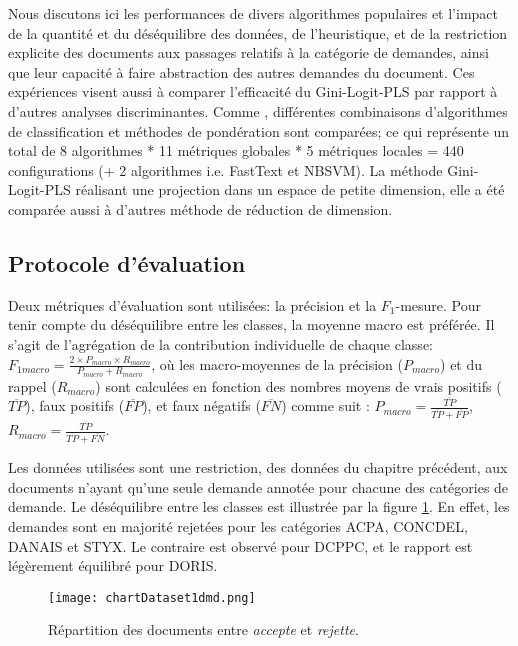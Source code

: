 Nous discutons ici les performances de divers algorithmes populaires et l'impact de la quantité et du déséquilibre des données, de l'heuristique, et de la restriction explicite des documents aux passages relatifs à la catégorie de demandes, ainsi que leur capacité à faire abstraction des autres demandes du document. {Ces expériences visent aussi à comparer l'efficacité du Gini-Logit-PLS par rapport à d'autres analyses discriminantes}. Comme \citet{im2017textclasstermweighting}, différentes combinaisons d'algorithmes de classification et méthodes de pondération sont comparées; ce qui représente un total de 8 algorithmes * 11 métriques globales * 5 métriques locales = 440 configurations (+ 2 algorithmes i.e. FastText et NBSVM). La méthode Gini-Logit-PLS réalisant une projection dans un espace de petite dimension, elle a été comparée aussi à d'autres méthode de réduction de dimension.

\subsection{Protocole d'évaluation}
Deux métriques d'évaluation sont utilisées: la précision et la $F_1$-mesure. Pour tenir compte du déséquilibre entre les classes, la moyenne macro est préférée. Il s'agit de l'agrégation de la contribution individuelle de chaque classe: $F_{1macro} = \frac{2 \times P_{macro} \times R_{macro}}{P_{macro} + R_{macro}}$, où les macro-moyennes de la précision ($P_{macro}$) et du rappel ($R_{macro}$) sont calculées en fonction des nombres moyens de vrais positifs ($\overline{TP}$), faux positifs ($\overline{FP}$), et faux négatifs ($\overline{FN}$) comme suit \citep{van2013macromicroeval}:
$P_{macro} = \frac{\overline{TP}}{\overline{TP} + \overline{FP}}$, $R_{macro} = \frac{\overline{TP}}{\overline{TP} + \overline{FN}}$.


Les données utilisées sont une restriction, des données du chapitre précédent, aux documents n'ayant qu'une seule demande annotée pour chacune des catégories de demande. Le déséquilibre entre les classes est illustrée par la figure \ref{fig:sensresultat:stat-1dmd}. En effet, les demandes sont en majorité rejetées pour les catégories ACPA, CONCDEL, DANAIS et STYX. Le contraire est observé pour DCPPC, et le rapport est légèrement équilibré pour DORIS.
\begin{figure}[htb]
	\centering
\texttt{[image: chartDataset1dmd.png]}
\caption{Répartition des documents entre \textit{accepte} et \textit{rejette}.}\label{fig:sensresultat:stat-1dmd}
\end{figure}

